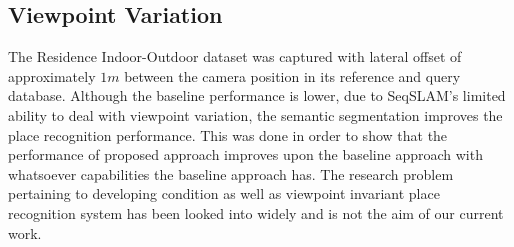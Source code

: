 \documentclass[letterpaper, 10 pt, conference]{ieeeconf}  %
\begin{document}
\subsection{Viewpoint Variation}
The Residence Indoor-Outdoor dataset was captured with lateral offset of approximately $1 m$ between the camera position in its reference and query database. Although the baseline performance is lower, due to SeqSLAM's limited ability to deal with viewpoint variation, the semantic segmentation improves the place recognition performance. This was done in order to show that the performance of proposed approach improves upon the baseline approach with whatsoever capabilities the baseline approach has. The research problem pertaining to developing condition as well as viewpoint invariant place recognition system has been looked into widely \cite{milford2015sequence,chen2017deep} and is not the aim of our current work.
\end{document}
